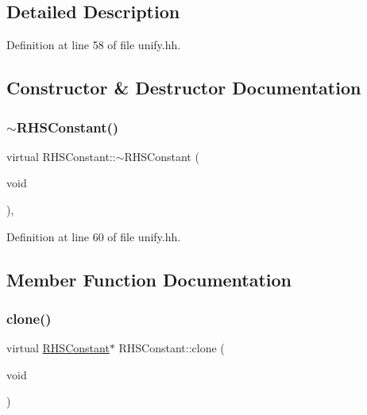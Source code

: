 \subsection{Detailed Description}


Definition at line 58 of file unify.\+hh.



\subsection{Constructor \& Destructor Documentation}
\mbox{\label{class_r_h_s_constant_a8e18f575d951ea4cfe571920be95eae1}} 
\subsubsection{\texorpdfstring{$\sim$RHSConstant()}{~RHSConstant()}}
{\footnotesize\ttfamily virtual R\+H\+S\+Constant\+::$\sim$\+R\+H\+S\+Constant (\begin{DoxyParamCaption}\item[{void}]{ }\end{DoxyParamCaption})\hspace{0.3cm}{\ttfamily [inline]}, {\ttfamily [virtual]}}



Definition at line 60 of file unify.\+hh.



\subsection{Member Function Documentation}
\mbox{\label{class_r_h_s_constant_a3e43335a89351a453932a8c0544d5722}} 
\subsubsection{\texorpdfstring{clone()}{clone()}}
{\footnotesize\ttfamily virtual \mbox{\hyperlink{class_r_h_s_constant}{R\+H\+S\+Constant}}$\ast$ R\+H\+S\+Constant\+::clone (\begin{DoxyParamCaption}\item[{void}]{ }\end{DoxyParamCaption})\hspace{0.3cm}{\ttfamily [pure virtual]}}



